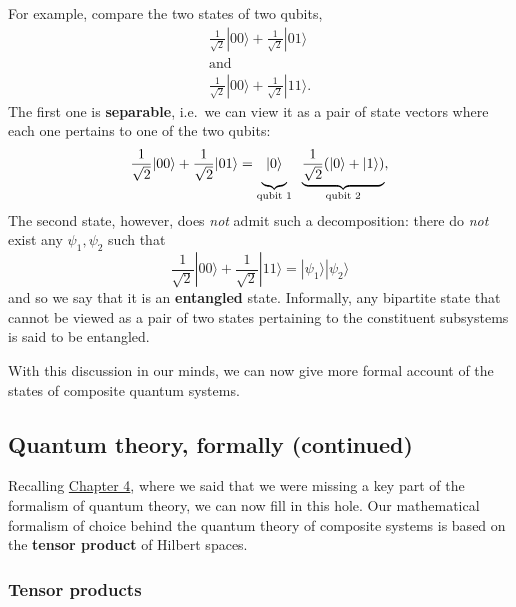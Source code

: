 \documentclass[fleqn]{article}
\begin{document}
For example, compare the two states of two qubits,
\[
  \begin{gathered}
    \frac{1}{\sqrt 2}|00\rangle + \frac{1}{\sqrt 2}|01\rangle
  \\\text{and}
  \\\frac{1}{\sqrt 2}|00\rangle + \frac{1}{\sqrt 2}|11\rangle.
  \end{gathered}
\]
The first one is \textbf{separable}, i.e.~we can view it as a pair of state vectors where each one pertains to one of the two qubits:
\[
  \frac{1}{\sqrt 2}|00\rangle + \frac{1}{\sqrt 2}|01\rangle
  = \underbrace{\vphantom{\frac{1}{\sqrt 2}}|0\rangle}_{\text{qubit 1}}
  \;\;
  \underbrace{\frac{1}{\sqrt 2}(|0\rangle+|1\rangle)}_{\text{qubit 2}},
\]
The second state, however, does \emph{not} admit such a decomposition: there do \emph{not} exist any \(\psi_1,\psi_2\) such that
\[
  \frac{1}{\sqrt 2}|00\rangle + \frac{1}{\sqrt 2}|11\rangle
  =
  |\psi_1\rangle|\psi_2\rangle
\]
and so we say that it is an \textbf{entangled} state.
Informally, any bipartite state that cannot be viewed as a pair of two states pertaining to the constituent subsystems is said to be entangled.

With this discussion in our minds, we can now give more formal account of the states of composite quantum systems.

\hypertarget{quantum-theory-formally-continued}{%
\subsection{Quantum theory, formally (continued)}\label{quantum-theory-formally-continued}}

Recalling \protect\hyperlink{chapter4}{Chapter 4}, where we said that we were missing a key part of the formalism of quantum theory, we can now fill in this hole.
Our mathematical formalism of choice behind the quantum theory of composite systems is based on the \textbf{tensor product} of Hilbert spaces.

\hypertarget{tensor-products}{%
\subsubsection{Tensor products}\label{tensor-products}}
\end{document}

